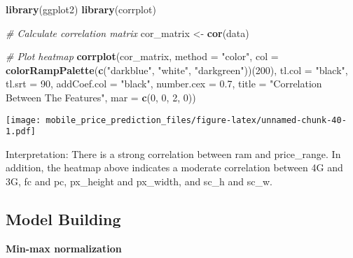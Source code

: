 \documentclass[
]{article}
\newenvironment{Shaded}{\begin{snugshade}}{\end{snugshade}}
\newcommand{\AttributeTok}[1]{\textcolor[rgb]{0.13,0.29,0.53}{#1}}
\newcommand{\CommentTok}[1]{\textcolor[rgb]{0.56,0.35,0.01}{\textit{#1}}}
\newcommand{\DecValTok}[1]{\textcolor[rgb]{0.00,0.00,0.81}{#1}}
\newcommand{\FloatTok}[1]{\textcolor[rgb]{0.00,0.00,0.81}{#1}}
\newcommand{\FunctionTok}[1]{\textcolor[rgb]{0.13,0.29,0.53}{\textbf{#1}}}
\newcommand{\NormalTok}[1]{#1}
\newcommand{\OtherTok}[1]{\textcolor[rgb]{0.56,0.35,0.01}{#1}}
\newcommand{\StringTok}[1]{\textcolor[rgb]{0.31,0.60,0.02}{#1}}
\begin{document}
\begin{Shaded}
\begin{Highlighting}[]
\FunctionTok{library}\NormalTok{(ggplot2)}
\FunctionTok{library}\NormalTok{(corrplot)}

\CommentTok{\# Calculate correlation matrix}
\NormalTok{cor\_matrix }\OtherTok{\textless{}{-}} \FunctionTok{cor}\NormalTok{(data)}

\CommentTok{\# Plot heatmap}
\FunctionTok{corrplot}\NormalTok{(cor\_matrix, }\AttributeTok{method =} \StringTok{"color"}\NormalTok{, }\AttributeTok{col =} \FunctionTok{colorRampPalette}\NormalTok{(}\FunctionTok{c}\NormalTok{(}\StringTok{"darkblue"}\NormalTok{, }\StringTok{"white"}\NormalTok{, }\StringTok{"darkgreen"}\NormalTok{))(}\DecValTok{200}\NormalTok{),}
         \AttributeTok{tl.col =} \StringTok{"black"}\NormalTok{, }\AttributeTok{tl.srt =} \DecValTok{90}\NormalTok{, }\AttributeTok{addCoef.col =} \StringTok{"black"}\NormalTok{, }\AttributeTok{number.cex =} \FloatTok{0.7}\NormalTok{,}
         \AttributeTok{title =} \StringTok{"Correlation Between The Features"}\NormalTok{, }\AttributeTok{mar =} \FunctionTok{c}\NormalTok{(}\DecValTok{0}\NormalTok{, }\DecValTok{0}\NormalTok{, }\DecValTok{2}\NormalTok{, }\DecValTok{0}\NormalTok{))}
\end{Highlighting}
\end{Shaded}

\texttt{[image: mobile\_price\_prediction\_files/figure-latex/unnamed-chunk-40-1.pdf]}

Interpretation: There is a strong correlation between ram and
price\_range. In addition, the heatmap above indicates a moderate
correlation between 4G and 3G, fc and pc, px\_height and px\_width, and
sc\_h and sc\_w.

\subsection{Model Building}\label{model-building}

\textbf{Min-max normalization}
\end{document}
